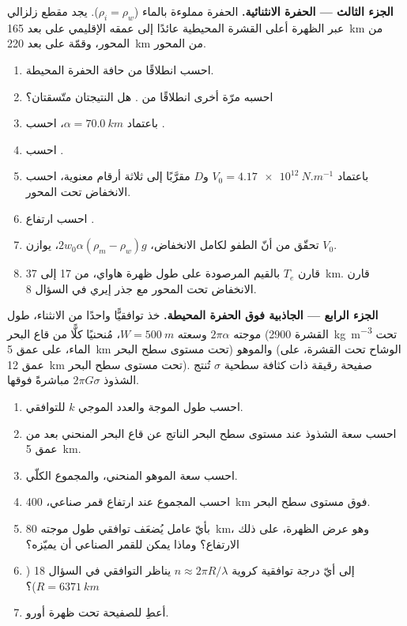 \begin{problem}
\noindent\textbf{الجزء الثالث --- الحفرة الانثنائية.} الحفرة مملوءة بالماء
($\rho_i = \rho_w$). يجد مقطع زلزالي عبر الظهرة أعلى
القشرة المحيطية عائدًا إلى عمقه الإقليمي على بعد \qty{165}{km} من المحور،
وقمّة  على بعد \qty{220}{km} من المحور.
\begin{enumerate}[resume]
  \item احسب  انطلاقًا من حافة الحفرة المحيطة.
  \item احسبه مرّة أخرى انطلاقًا من . هل النتيجتان متّسقتان؟
  \item باعتماد $\alpha = \qty{70.0}{km}$، احسب .
  \item احسب .
  \item باعتماد $V_0 = \qty{4.17e12}{N.m^{-1}}$ و$D$ مقرَّبًا إلى ثلاثة
        أرقام معنوية، احسب الانخفاض تحت المحور.
  \item احسب ارتفاع .
  \item تحقّق من أنّ الطفو لكامل الانخفاض، $2w_0\alpha(\rho_m -
        \rho_w)g$، يوازن $V_0$.
  \item قارن $T_e$ بالقيم المرصودة على طول ظهرة هاواي، من 17 إلى
        \qty{37}{km}. قارن الانخفاض تحت المحور مع
        جذر إيري في السؤال 8.
\end{enumerate}

\noindent\textbf{الجزء الرابع --- الجاذبية فوق الحفرة المحيطة.} خذ توافقيًّا واحدًا من
الانثناء، طول موجته $2\pi\alpha$ وسعته $W = \qty{500}{m}$، مُنحنيًا
كلًّا من قاع البحر (القشرة \qty{2900}{kg.m^{-3}} تحت الماء، على عمق \qty{5}{km} تحت
مستوى سطح البحر) والموهو (الوشاح تحت القشرة، على عمق \qty{12}{km} تحت مستوى سطح البحر). صفيحة
رقيقة ذات كثافة سطحية $\sigma$ تُنتج الشذوذ $2\pi G\sigma$
مباشرةً فوقها.
\begin{enumerate}[resume]
  \item احسب طول الموجة والعدد الموجي $k$ للتوافقي.
  \item احسب سعة الشذوذ عند مستوى سطح البحر الناتج عن قاع البحر المنحني
        بعد  من عمق \qty{5}{km}.
  \item احسب سعة الموهو المنحني، والمجموع الكلّي.
  \item احسب المجموع عند ارتفاع قمر صناعي، \qty{400}{km} فوق
        مستوى سطح البحر.
  \item بأيّ عامل يُضعَف توافقي طول موجته \qty{80}{km}، وهو عرض
        الظهرة، على ذلك الارتفاع؟ وماذا يمكن للقمر الصناعي أن يميّزه؟
  \item إلى أيّ درجة توافقية كروية $n \approx 2\pi R/\lambda$ يناظر
        التوافقي في السؤال 18 ($R = \qty{6371}{km}$)؟
  \item أعطِ  للصفيحة تحت ظهرة
        أورو.
\end{enumerate}
\end{problem}
